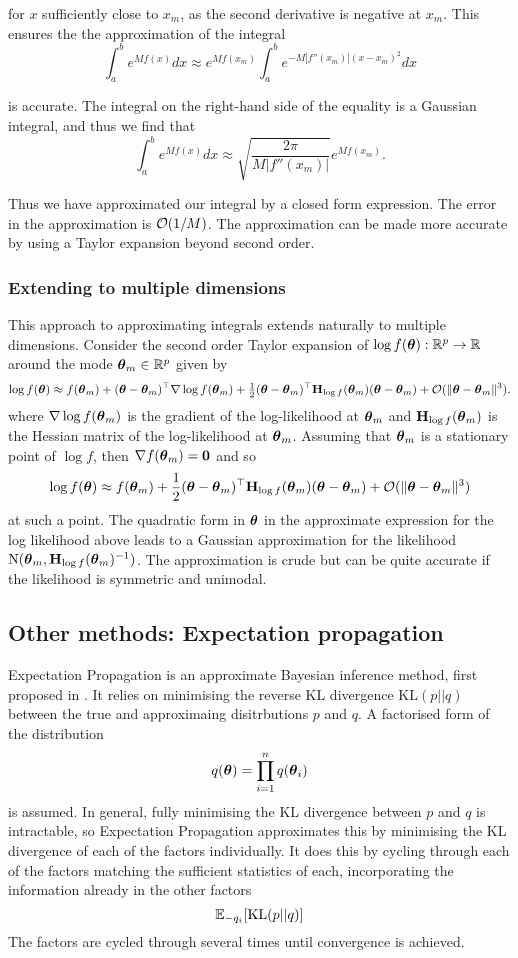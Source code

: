 \noindent for $x$ sufficiently close to $x_m$, as the second derivative is negative at $x_m$. This ensures the
the approximation of the integral
$$
	\int_a^b e^{M f(x)} dx \approx e^{M f(x_m)} \int_a^b e^{-M |f''(x_m)|(x - x_m)^2} dx
$$

\noindent is accurate. The integral on the right-hand side of the equality is a Gaussian integral, and thus we
find that
$$
	\int_a^b e^{M f(x)} dx \approx \sqrt{\frac{2 \pi}{M |f''(x_m)|}} e^{M f(x_m)}.
$$

\noindent Thus we have approximated our integral by a closed form expression. The error in the approximation
is $\mathcal{O}(1/M)$. The approximation can be made more accurate by using a Taylor expansion beyond second order.

\subsubsection{Extending to multiple dimensions}
This approach to approximating integrals extends naturally to multiple dimensions. Consider the second order
Taylor expansion of $\log f({\boldsymbol \theta}): {\mathbb{R}}^p \to {\mathbb{R}}$ around the mode ${\boldsymbol \theta}_m \in {\mathbb{R}}^p$ given by
$$
\log f({\boldsymbol \theta}) \approx f({\boldsymbol \theta}_m) + ({\boldsymbol \theta} - {\boldsymbol \theta}_m)^\top \nabla \log f({\boldsymbol \theta}_m) + \tfrac{1}{2} ({\boldsymbol \theta} - {\boldsymbol \theta}_m)^\top {\bf H}_{\log f}({\boldsymbol \theta}_m) ({\boldsymbol \theta} - {\boldsymbol \theta}_m) + \mathcal{O}(\|{\boldsymbol \theta} - {\boldsymbol \theta}_m\|^3).
$$
where $\nabla \log f({\boldsymbol \theta}_m)$ is the gradient of the log-likelihood at ${\boldsymbol \theta}_m$ and ${\bf H}_{\log
f}({\boldsymbol \theta}_m)$ is the Hessian matrix of the log-likelihood at ${\boldsymbol \theta}_m$. Assuming that ${\boldsymbol \theta}_m$ is a
stationary point of $\log f$, then $\nabla f({\boldsymbol \theta}_m) = {\bf 0}$ and so
$$
\log f({\boldsymbol \theta}) \approx f({\boldsymbol \theta}_m) + \frac{1}{2} ({\boldsymbol \theta} - {\boldsymbol \theta}_m)^\top {\bf H}_{\log f}({\boldsymbol \theta}_m) ({\boldsymbol \theta} - {\boldsymbol \theta}_m) + \mathcal{O}(\|{\boldsymbol \theta} - {\boldsymbol \theta}_m\|^3)
$$
\noindent at such a point. The quadratic form in ${\boldsymbol \theta}$ in the approximate expression for the log
likelihood above leads to a Gaussian approximation for the likelihood $\text{N}({\boldsymbol \theta}_m, {\bf H}_{\log
f}({\boldsymbol \theta}_m)^{-1})$. The approximation is crude but can be quite accurate if the likelihood is symmetric and
unimodal.

\subsection{Other methods: Expectation propagation}
Expectation Propagation is an approximate Bayesian inference method, first proposed in \citep{Minka2001}.
It relies on minimising the reverse KL divergence $\text{KL}(p || q)$ between the true and approximaing
disitrbutions $p$ and $q$. A factorised form of the distribution
\[
	q({\boldsymbol \theta}) = \prod_{i=1}^n q({\boldsymbol \theta}_i)
\]
is assumed. In general, fully minimising the KL divergence between $p$ and $q$ is intractable, so Expectation
Propagation approximates this by minimising the KL divergence of each of the factors individually.
It does this by cycling through each of the factors matching the sufficient statistics of each, incorporating
the information already in the other factors
\[
	{\mathbb E}_{-q_i} [\text{KL}(p || q)]
\]
The factors are cycled through several times until convergence is achieved.

